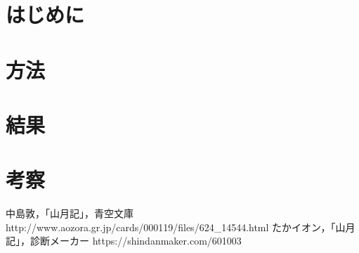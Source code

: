 \documentclass{jsarticle}
\begin{document}

\maketitle
\thispagestyle{empty}

\section{はじめに}

\section{方法}

\section{結果}

\section{考察}

\begin{thebibliography}{2}
 中島敦，「山月記」，青空文庫 http://www.aozora.gr.jp/cards/000119/files/624\_14544.html
 たかイオン，「山月記」，診断メーカー https://shindanmaker.com/601003
\end{thebibliography}
\end{document}
